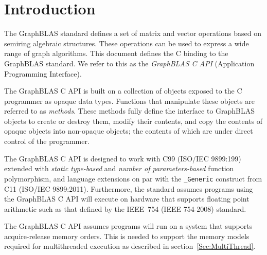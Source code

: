 \documentclass[11pt]{extbook}
\begin{document}

\chapter{Introduction}

The GraphBLAS standard defines a set of matrix and vector operations 
based on semiring algebraic structures.  These operations can be used
to express a wide range of graph algorithms.  This document 
defines the C binding to the GraphBLAS standard.  We refer to 
this as the {\it GraphBLAS C API} (Application Programming Interface).   

The GraphBLAS C API is built on a collection of   
objects exposed to the C programmer as opaque data types. 
Functions that manipulate these objects are referred to as 
{\it methods}.  These methods fully define the 
interface to GraphBLAS objects to create or destroy them, modify their 
contents, and copy the contents of opaque objects into non-opaque objects; the 
contents of which are under direct control of the programmer.

The GraphBLAS C API is designed to work with C99 (ISO/IEC 9899:199) 
extended with {\it static type-based} and {\it number of parameters-based}
function polymorphism, and language extensions on par with 
the {\tt \_Generic} construct from C11 (ISO/IEC 9899:2011).  
Furthermore, the standard assumes programs using the GraphBLAS C API
will execute on hardware that supports floating point arithmetic
such as that defined by the IEEE~754 (IEEE 754-2008) standard. 

The GraphBLAS C API assumes programs will run on a system
that supports acquire-release memory orders.  This is needed to support
the memory models required for multithreaded execution as described in section~\ref{Sec:MultiThread}.
\end{document}
